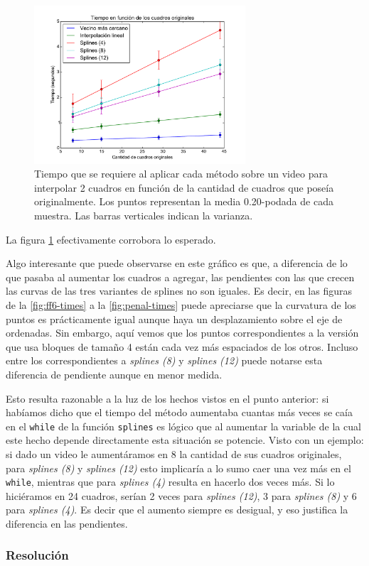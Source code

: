 \begin{figure}[H]
 \centering
	\includegraphics[width=0.7\textwidth]{imgs/resultados_tiempos/ff6_times_cuadros.pdf}
	\caption{\footnotesize Tiempo que se requiere al aplicar cada método sobre un video para interpolar 2 cuadros en función de la cantidad de cuadros que poseía originalmente. Los puntos representan la media 0.20-podada de cada muestra. Las barras verticales indican la varianza.}
	\label{fig:ff6-times-cuadros}
\end{figure}

La figura \ref{fig:ff6-times-cuadros} efectivamente corrobora lo esperado. 

Algo interesante que puede observarse en este gráfico es que, a diferencia de lo que pasaba al aumentar los cuadros a agregar, las pendientes con las que crecen las curvas de las tres variantes de splines no son iguales. Es decir, en las figuras de la \ref{fig:ff6-times} a la \ref{fig:penal-times} puede apreciarse que la curvatura de los puntos es prácticamente igual aunque haya un desplazamiento sobre el eje de ordenadas. Sin embargo, aquí vemos que los puntos correspondientes a la versión que usa bloques de tamaño 4 están cada vez más espaciados de los otros. Incluso entre los correspondientes a \emph{splines (8)} y \emph{splines (12)} puede notarse esta diferencia de pendiente aunque en menor medida.

Esto resulta razonable a la luz de los hechos vistos en el punto anterior: si habíamos dicho que el tiempo del método aumentaba cuantas más veces se caía en el \texttt{while} de la función \texttt{splines} es lógico que al aumentar la variable de la cual este hecho depende directamente esta situación se potencie. Visto con un ejemplo: si dado un video le aumentáramos en 8 la cantidad de sus cuadros originales, para \emph{splines (8)} y \emph{splines (12)} esto implicaría a lo sumo caer una vez más en el \texttt{while}, mientras que para \emph{splines (4)} resulta en hacerlo dos veces más. Si lo hiciéramos en 24 cuadros, serían 2 veces para \emph{splines (12)}, 3 para \emph{splines (8)} y 6 para \emph{splines (4)}. Es decir que el aumento siempre es desigual, y eso justifica la diferencia en las pendientes.

\subsubsection{Resolución}
